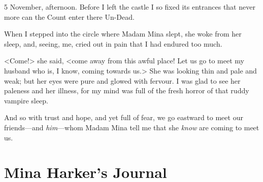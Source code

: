 \begin{diary}{5 November, afternoon.}
Before I left the castle I so fixed its entrances that never more can the Count enter there Un-Dead.

When I stepped into the circle where Madam Mina slept, she woke from her sleep, and, seeing, me, cried out in pain that I had endured too much.

<Come!> she said, <come away from this awful place! Let us go to meet my husband who is, I know, coming towards us.> She was looking thin and pale and weak; but her eyes were pure and glowed with fervour. I was glad to see her paleness and her illness, for my mind was full of the fresh horror of that ruddy vampire sleep.

And so with trust and hope, and yet full of fear, we go eastward to meet our friends—and \textit{him}—whom Madam Mina tell me that she \textit{know} are coming to meet us.
	\end{diary}

\section{Mina Harker's Journal}


